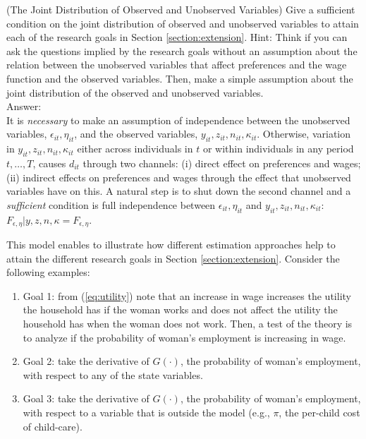 \begin{exercise} (The Joint Distribution of Observed and Unobserved Variables)
Give a sufficient condition on the joint distribution of observed and unobserved variables to attain each of the research goals in Section \ref{section:extension}. Hint: Think if you can ask the questions implied by the research goals without an assumption about the relation between the unobserved variables that affect preferences and the wage function and the observed variables. Then, make a simple assumption about the joint distribution of the observed and unobserved variables.\\
\noindent Answer:\\
\noindent It is \emph{necessary} to make an assumption of independence between the unobserved variables, $\epsilon_{it}, \eta_{it}$, and the observed variables, $y_{it}, z_{it}, n_{it}, \kappa_{it}$. Otherwise, variation in $y_{it}, z_{it}, n_{it}, \kappa_{it}$ either across individuals in $t$ or within individuals in any period $t, \ldots, T$, causes $d_{it}$ through two channels: (i) direct effect on preferences and  wages; (ii) indirect effects on preferences and wages through the effect that unobserved variables have on this. A natural step is to shut down the second channel and a \emph{sufficient} condition is full independence between $\epsilon_{it}, \eta_{it}$ and  $y_{it}, z_{it}, n_{it}, \kappa_{it}$: $F_{\epsilon, \eta}|y, z, n, \kappa = F_{\epsilon,\eta}$.
\end{exercise}

\indent This model enables to illustrate how different estimation approaches help to attain the different research goals in Section \ref{section:extension}. Consider the following examples:
\begin{enumerate}
\item Goal 1: from (\ref{eq:utility}) note that an increase in wage increases the utility the household has if the woman works and does not affect the utility the household has when the woman does not work. Then, a test of the theory is to analyze if the probability of woman's employment is increasing in wage. 
\item Goal 2: take the derivative of $G(\cdot)$, the probability of woman's employment, with respect to any of the state variables.
\item Goal 3: take the derivative of $G(\cdot)$, the probability of woman's employment, with respect to a variable that is outside the model (e.g., $\pi$, the per-child cost of child-care). 
\end{enumerate}

